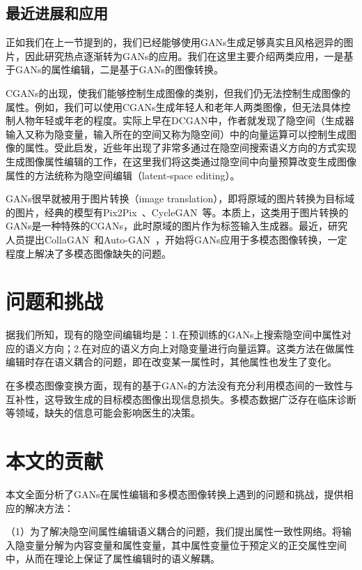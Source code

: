 \subsection{最近进展和应用}

正如我们在上一节提到的，我们已经能够使用GANs生成足够真实且风格迥异的图片，因此研究热点逐渐转为GANs的应用。我们在这里主要介绍两类应用，一是基于GANs的属性编辑，二是基于GANs的图像转换。

CGANs的出现，使我们能够控制生成图像的类别，但我们仍无法控制生成图像的属性。例如，我们可以使用CGANs生成年轻人和老年人两类图像，但无法具体控制人物年轻或年老的程度。实际上早在DCGAN中，作者就发现了隐空间（生成器输入又称为隐变量，输入所在的空间又称为隐空间）中的向量运算可以控制生成图像的属性。受此启发，近些年出现了非常多通过在隐空间搜索语义方向的方式实现生成图像属性编辑的工作\cite{icml2020, harkonen2020ganspace, iclr2021, interfacegan, steer,variation}，在这里我们将这类通过隐空间中向量预算改变生成图像属性的方法统称为隐空间编辑（latent-space editing）。

GANs很早就被用于图片转换（image translation），即将原域的图片转换为目标域的图片，经典的模型有Pix2Pix~\cite{pix2pix}、CycleGAN~\cite{cyclegan}等。本质上，这类用于图片转换的GANs是一种特殊的CGANs，此时原域的图片作为标签输入生成器。最近，研究人员提出CollaGAN~\cite{collagan}和Auto-GAN~\cite{AutoGAN}，开始将GANs应用于多模态图像转换，一定程度上解决了多模态图像缺失的问题。


\section{问题和挑战}

据我们所知，现有的隐空间编辑均是：1.在预训练的GANs上搜索隐空间中属性对应的语义方向；2.在对应的语义方向上对隐变量进行向量运算。这类方法在做属性编辑时存在语义耦合的问题，即在改变某一属性时，其他属性也发生了变化。

在多模态图像变换方面，现有的基于GANs的方法没有充分利用模态间的一致性与互补性，这导致生成的目标模态图像出现信息损失。多模态数据广泛存在临床诊断等领域，缺失的信息可能会影响医生的决策。

\section{本文的贡献}

本文全面分析了GANs在属性编辑和多模态图像转换上遇到的问题和挑战，提供相应的解决方法：

（1）为了解决隐空间属性编辑语义耦合的问题，我们提出属性一致性网络。将输入隐变量分解为内容变量和属性变量，其中属性变量位于预定义的正交属性空间中，从而在理论上保证了属性编辑时的语义解耦。

